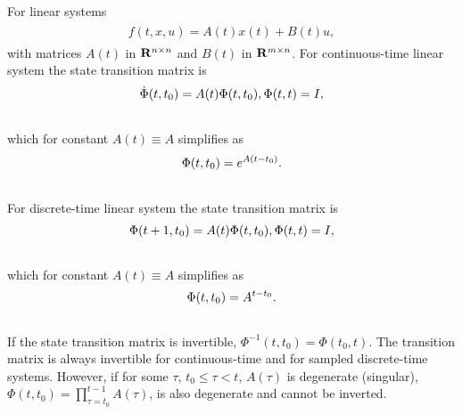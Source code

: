\documentclass[letterpaper,10pt,english]{sphinxmanual}
\begin{document}
For linear systems
\label{main_source:equation-linearrhs}\begin{gather}
\begin{split}f(t, x, u) = A(t)x(t) + B(t)u,\end{split}\label{main_source-linearrhs}
\end{gather}
with matrices $A(t)$ in ${\bf R}^{n\times n}$ and
$B(t)$ in ${\bf R}^{m\times n}$. For continuous-time linear
system the state transition matrix is
\begin{gather}
\begin{split}\dot{\Phi}(t, t_0) = A(t)\Phi(t, t_0), \Phi(t, t) = I,\end{split}\notag\\\begin{split}\end{split}\notag
\end{gather}
which for constant $A(t)\equiv A$ simplifies as
\begin{gather}
\begin{split}\Phi(t, t_0) = e^{A(t-t_0)} .\end{split}\notag\\\begin{split}\end{split}\notag
\end{gather}
For discrete-time linear system the state transition matrix is
\begin{gather}
\begin{split}\Phi(t+1, t_0) = A(t)\Phi(t, t_0), \Phi(t, t) = I,\end{split}\notag\\\begin{split}\end{split}\notag
\end{gather}
which for constant $A(t)\equiv A$ simplifies as
\begin{gather}
\begin{split}\Phi(t, t_0) = A^{t-t_0} .\end{split}\notag\\\begin{split}\end{split}\notag
\end{gather}
If the state transition matrix is invertible,
$\Phi^{-1}(t, t_0) = \Phi(t_0, t)$. The transition matrix is
always invertible for continuous-time and for sampled discrete-time
systems. However, if for some $\tau$, $t_0\leqslant\tau<t$,
$A(\tau)$ is degenerate (singular),
$\Phi(t, t_0)=\prod_{\tau=t_0}^{t-1}A(\tau)$, is also degenerate
and cannot be inverted.
\end{document}
